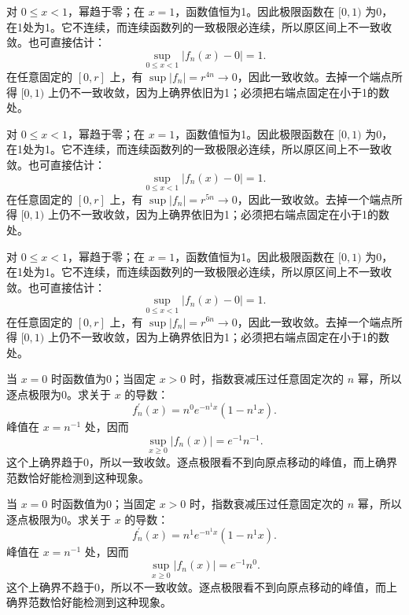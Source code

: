 \documentclass[12pt,fontset=fandol]{ctexart}
\begin{document}
\begin{solve}\label{ans:c28q4}
对 $0\le x<1$，幂趋于零；在 $x=1$，函数值恒为1。因此极限函数在 $[0,1)$ 为0，在1处为1。它不连续，而连续函数列的一致极限必连续，所以原区间上不一致收敛。也可直接估计：
\[
\sup_{0\le x<1}|f_n(x)-0|=1.
\]
在任意固定的 $[0,r]$ 上，有 $\sup|f_n|=r^{4n}\to0$，因此一致收敛。去掉一个端点所得 $[0,1)$ 上仍不一致收敛，因为上确界依旧为1；必须把右端点固定在小于1的数处。
\end{solve}

\begin{solve}\label{ans:c28q5}
对 $0\le x<1$，幂趋于零；在 $x=1$，函数值恒为1。因此极限函数在 $[0,1)$ 为0，在1处为1。它不连续，而连续函数列的一致极限必连续，所以原区间上不一致收敛。也可直接估计：
\[
\sup_{0\le x<1}|f_n(x)-0|=1.
\]
在任意固定的 $[0,r]$ 上，有 $\sup|f_n|=r^{5n}\to0$，因此一致收敛。去掉一个端点所得 $[0,1)$ 上仍不一致收敛，因为上确界依旧为1；必须把右端点固定在小于1的数处。
\end{solve}

\begin{solve}\label{ans:c28q6}
对 $0\le x<1$，幂趋于零；在 $x=1$，函数值恒为1。因此极限函数在 $[0,1)$ 为0，在1处为1。它不连续，而连续函数列的一致极限必连续，所以原区间上不一致收敛。也可直接估计：
\[
\sup_{0\le x<1}|f_n(x)-0|=1.
\]
在任意固定的 $[0,r]$ 上，有 $\sup|f_n|=r^{6n}\to0$，因此一致收敛。去掉一个端点所得 $[0,1)$ 上仍不一致收敛，因为上确界依旧为1；必须把右端点固定在小于1的数处。
\end{solve}

\begin{solve}\label{ans:c28q7}
当 $x=0$ 时函数值为0；当固定 $x>0$ 时，指数衰减压过任意固定次的 $n$ 幂，所以逐点极限为0。求关于 $x$ 的导数：
\[
f_n^{\prime}(x)=n^{0}e^{-n^{1}x}(1-n^{1}x).
\]
峰值在 $x=n^{-1}$ 处，因而
\[
\sup_{x\ge0}|f_n(x)|=e^{-1}n^{-1}.
\]
这个上确界趋于0，所以一致收敛。逐点极限看不到向原点移动的峰值，而上确界范数恰好能检测到这种现象。
\end{solve}

\begin{solve}\label{ans:c28q8}
当 $x=0$ 时函数值为0；当固定 $x>0$ 时，指数衰减压过任意固定次的 $n$ 幂，所以逐点极限为0。求关于 $x$ 的导数：
\[
f_n^{\prime}(x)=n^{1}e^{-n^{1}x}(1-n^{1}x).
\]
峰值在 $x=n^{-1}$ 处，因而
\[
\sup_{x\ge0}|f_n(x)|=e^{-1}n^{0}.
\]
这个上确界不趋于0，所以不一致收敛。逐点极限看不到向原点移动的峰值，而上确界范数恰好能检测到这种现象。
\end{solve}
\end{document}

